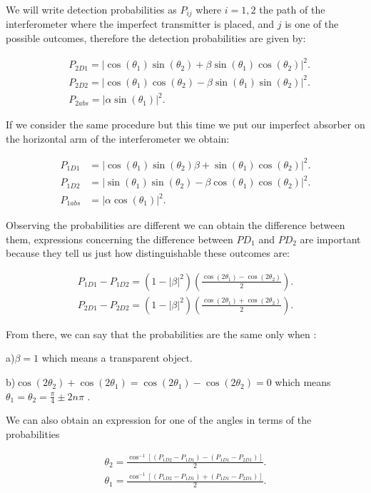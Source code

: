 \documentclass[12pt]{book}
\begin{document}
We will write detection probabilities as $P_{ij}$ where $i=1,2$ the path of the interferometer where the imperfect transmitter is placed, and $j$ is one of the possible outcomes, therefore the detection probabilities are given by:

\begin{align}
& P_{2D1}=|\cos(\theta_{1})\sin(\theta_{2})+\beta \sin(\theta_{1})\cos(\theta_{2})|^2. \\
& P_{2D2}=|\cos(\theta_{1})\cos(\theta_{2})-\beta \sin(\theta_{1})\sin(\theta_{2})|^2. \\
& P_{2abs}=|\alpha \sin(\theta_{1})|^2. 
\end{align}

If we consider the same procedure but this time we put our imperfect absorber on the horizontal arm of the interferometer we obtain:

\begin{align}
P_{1D1}&=|\cos(\theta_{1})\sin(\theta_{2})\beta +\sin(\theta_{1})\cos(\theta_{2})|^2. \\
P_{1D2}&=|\sin(\theta_{1})\sin(\theta_{2})-\beta \cos(\theta_{1})\cos(\theta_{2})|^2.\\
P_{1abs}&=|\alpha \cos(\theta_{1})|^2.
\end{align}



Observing the probabilities are different we can obtain the difference between them, expressions concerning the difference between $PD_{1}$ and $PD_{2}$ are important because they tell us just how distinguishable these outcomes are:


\begin{align}
P_{1D1}-P_{1D2}=(1-|\beta|^2)\left(\frac{\cos(2 \theta_{1})-\cos(2 \theta_{2})}{2}\right). \\
P_{2D1}-P_{2D2}=(1-|\beta|^2)\left(\frac{\cos(2 \theta_{1})+\cos(2 \theta_{2})}{2}\right).
\end{align}

From there, we can say that the probabilities are the same only when :

a)$\beta=1  $ which means a transparent object.

b)$\cos(2 \theta_{2})+\cos(2\theta_{1})=\cos(2 \theta_{1})-\cos(2\theta_{2})=0$   which means   $\theta_{1}=\theta_{2}=\frac{\pi}{4}\pm 2n\pi$
.

We can also obtain an expression for one of the angles in terms of the probabilities


\begin{align}
\theta_{2}=\frac{\cos^{-1}[(P_{1D2}-P_{1D1})-(P_{1D1}-P_{2D1})]}{2}.\\
\theta_{1}=\frac{\cos^{-1}[(P_{1D2}-P_{1D1})+(P_{1D1}-P_{2D1})]}{2}.
\end{align}
\end{document}
